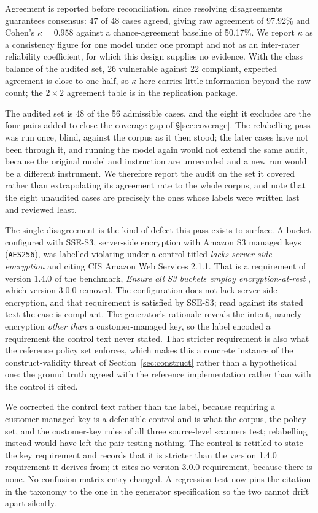 \documentclass[smallextended]{svjour3}
\begin{document}
Agreement is reported before reconciliation, since resolving disagreements
guarantees consensus: 47 of 48 cases agreed, giving raw agreement of 97.92\% and
Cohen's $\kappa = 0.958$ against a chance-agreement baseline of 50.17\%. We report
$\kappa$ as a consistency figure for one model under one prompt and not as an
inter-rater reliability coefficient, for which this design supplies no evidence. With
the class balance of the audited set, 26 vulnerable against 22 compliant, expected
agreement is close to one half, so $\kappa$ here carries little information beyond
the raw count; the $2 \times 2$ agreement table is in the replication package.

The audited set is 48 of the 56 admissible cases, and the eight it excludes are
the four pairs added to close the coverage gap of \S\ref{sec:coverage}. The
relabelling pass was run once, blind, against the corpus as it then stood; the
later cases have not been through it, and running the model again would not extend
the same audit, because the original model and instruction are unrecorded and a
new run would be a different instrument. We therefore report the
audit on the set it covered rather than extrapolating its agreement rate to the
whole corpus, and note that the eight unaudited cases are precisely the ones whose
labels were written last and reviewed least.

The single disagreement is the kind of defect this pass exists to surface. A
bucket configured with SSE-S3, server-side encryption with Amazon S3 managed keys
(\texttt{AES256}), was labelled violating under a
control titled \emph{lacks server-side encryption} and citing CIS Amazon Web
Services 2.1.1. That is a requirement of version 1.4.0 of the benchmark,
\emph{Ensure all S3 buckets employ encryption-at-rest} \citep{cis2021aws}, which
version 3.0.0 removed. The configuration does not lack server-side encryption,
and that requirement is satisfied by SSE-S3; read against its stated text the
case is compliant.
The generator's rationale reveals the intent, namely encryption \emph{other than}
a customer-managed key, so the label encoded a requirement the control text never
stated. That stricter requirement is also what the reference policy set enforces,
which makes this a concrete instance of the construct-validity threat of
Section~\ref{sec:construct} rather than a hypothetical one: the ground truth
agreed with the reference implementation rather than with the control it cited.

We corrected the control text rather than the label, because requiring a
customer-managed key is a defensible control and is what the corpus, the policy
set, and the customer-key rules of all three source-level scanners test;
relabelling instead would have left the pair testing nothing. The control is
retitled to state the key requirement and records that it is stricter than the
version 1.4.0 requirement it derives from; it cites no version 3.0.0 requirement,
because there is none. No confusion-matrix entry changed. A regression test now
pins the citation in the taxonomy to the one in the generator specification so
the two cannot drift apart silently.
\end{document}
